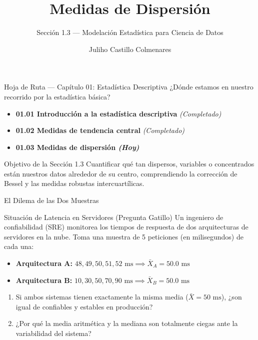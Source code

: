 \documentclass[10pt,aspectratio=169]{beamer}
\title{Medidas de Dispersión}
\subtitle{Sección 1.3 — Modelación Estadística para Ciencia de Datos}
\author[J. Castillo Colmenares]{Juliho Castillo Colmenares}
\institute{Tecnológico de Monterrey}
\date{}
\begin{document}
\begin{frame}[plain]
  \vspace{-0.8cm}
  \titlepage
\end{frame}

\begin{frame}{Hoja de Ruta — Capítulo 01: Estadística Descriptiva}
  ¿Dónde estamos en nuestro recorrido por la estadística básica? \pause
  \begin{itemize}
    \item \textbf{01.01 Introducción a la estadística descriptiva} \emph{(Completado)} \pause
    \item \textbf{01.02 Medidas de tendencia central} \emph{(Completado)} \pause
    \item \color{TecRojo}\textbf{01.03 Medidas de dispersión \emph{(Hoy)}}\color{black}
  \end{itemize}
  \vspace{1em}
  \begin{block}{Objetivo de la Sección 1.3}
    Cuantificar qué tan dispersos, variables o concentrados están nuestros datos alrededor de su centro, comprendiendo la corrección de Bessel y las medidas robustas intercuartílicas.
  \end{block}
\end{frame}

\begin{frame}{El Dilema de las Dos Muestras}
  \begin{alertblock}{Situación de Latencia en Servidores (Pregunta Gatillo)}
    Un ingeniero de confiabilidad (SRE) monitorea los tiempos de respuesta de dos arquitecturas de servidores en la nube. Toma una muestra de 5 peticiones (en milisegundos) de cada una:
    \vspace{0.4em}
    \begin{itemize}
      \item \textbf{Arquitectura A:} $48, 49, 50, 51, 52 \text{ ms} \implies \bar{X}_A = 50.0 \text{ ms}$
      \item \textbf{Arquitectura B:} $10, 30, 50, 70, 90 \text{ ms} \implies \bar{X}_B = 50.0 \text{ ms}$
    \end{itemize}
    \vspace{0.4em}
    \begin{enumerate}
      \item Si ambos sistemas tienen exactamente la misma media ($\bar{X} = 50 \text{ ms}$), ¿son igual de confiables y estables en producción? \pause
      \item ¿Por qué la media aritmética y la mediana son totalmente ciegas ante la variabilidad del sistema?
    \end{enumerate}
  \end{alertblock}
\end{frame}
\end{document}
